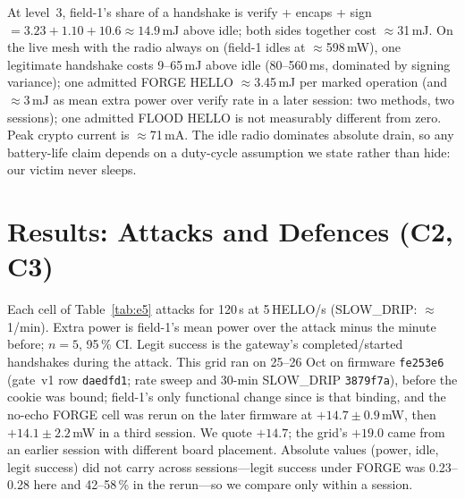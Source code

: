 \documentclass[conference]{IEEEtran}
\begin{document}
At level~3, field-1's share of a handshake is verify + encaps + sign $= 3.23+1.10+10.6\approx\mathbf{14.9}$\,mJ above
idle; both sides together cost $\approx$31\,mJ. On the live mesh with the radio always on (field-1 idles at
$\approx$598\,mW), one legitimate handshake costs 9--65\,mJ above idle (80--560\,ms, dominated by signing variance);
one admitted FORGE HELLO $\approx$3.45\,mJ per marked operation (and $\approx$3\,mJ as mean extra power over verify
rate in a later session: two methods, two sessions); one admitted FLOOD HELLO is not measurably different
from zero. Peak crypto current is $\approx$71\,mA. The idle radio dominates absolute drain, so any battery-life
claim depends on a duty-cycle assumption we state rather than hide: our victim never sleeps.

\section{Results: Attacks and Defences (C2, C3)}\label{sec:attack}
Each cell of Table~\ref{tab:e5} attacks for 120\,s at 5\,HELLO/s (SLOW\_DRIP: $\approx$1/min). Extra power is
field-1's mean power over the attack minus the minute before; $n=5$, 95\,\% CI. Legit success is the gateway's
completed/started handshakes during the attack. This grid ran on 25--26 Oct on firmware \texttt{fe253e6} (gate~v1
row \texttt{daedfd1}; rate sweep and 30-min SLOW\_DRIP \texttt{3879f7a}), before
the cookie was bound; field-1's only functional change since is that binding, and the no-echo FORGE cell was rerun
on the later firmware at $+14.7\pm0.9$\,mW, then $+14.1\pm2.2$\,mW in a third session. We quote $+14.7$; the
grid's $+19.0$ came from an earlier session with different board placement. Absolute values (power, idle, legit
success) did not carry across sessions---legit success under FORGE was 0.23--0.28 here and 42--58\,\% in the
rerun---so we compare only within a session.
\end{document}
